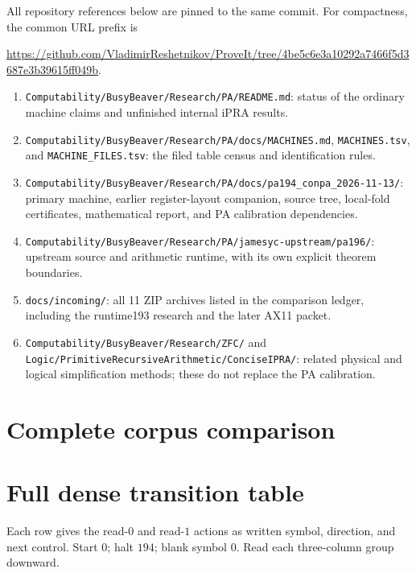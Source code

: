 \documentclass[11pt]{article}
\newcommand{\file}[1]{\nolinkurl{#1}}
\begin{document}
All repository references below are pinned to the same commit. For compactness,
the common URL prefix is
\begin{center}\small
\url{https://github.com/VladimirReshetnikov/ProveIt/tree/4be5c6e3a10292a7466f5d3687e3b39615ff049b}.
\end{center}
\begin{enumerate}
\item \file{Computability/BusyBeaver/Research/PA/README.md}: status of the ordinary machine claims and unfinished internal iPRA results.
\item \file{Computability/BusyBeaver/Research/PA/docs/MACHINES.md}, \file{MACHINES.tsv}, and \file{MACHINE_FILES.tsv}: the filed table census and identification rules.
\item \file{Computability/BusyBeaver/Research/PA/docs/pa194_conpa_2026-11-13/}: primary machine, earlier register-layout companion, source tree, local-fold certificates, mathematical report, and PA calibration dependencies.
\item \file{Computability/BusyBeaver/Research/PA/jamesyc-upstream/pa196/}: upstream source and arithmetic runtime, with its own explicit theorem boundaries.
\item \file{docs/incoming/}: all 11 ZIP archives listed in the comparison ledger, including the runtime193 research and the later AX11 packet.
\item \file{Computability/BusyBeaver/Research/ZFC/} and \file{Logic/PrimitiveRecursiveArithmetic/ConciseIPRA/}: related physical and logical simplification methods; these do not replace the PA calibration.
\end{enumerate}

\appendix
\section{Complete corpus comparison}


\clearpage
\section{Full dense transition table}
Each row gives the read-$0$ and read-$1$ actions as written symbol, direction,
and next control. Start $0$; halt $194$; blank symbol $0$. Read each
three-column group downward.

\end{document}
